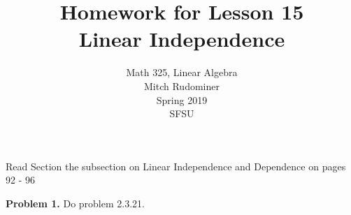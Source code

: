 \documentclass[oneside,12pt]{amsart}
\begin{document}
\title{Homework for Lesson 15 \\ Linear Independence}
\author{Math 325, Linear Algebra \\ Mitch Rudominer \\ Spring 2019 \\ SFSU }
\date{}

\maketitle

Read Section the subsection on Linear Independence and Dependence on pages
92 - 96

\bigskip


\textbf{Problem 1.} Do problem 2.3.21.
\end{document}
